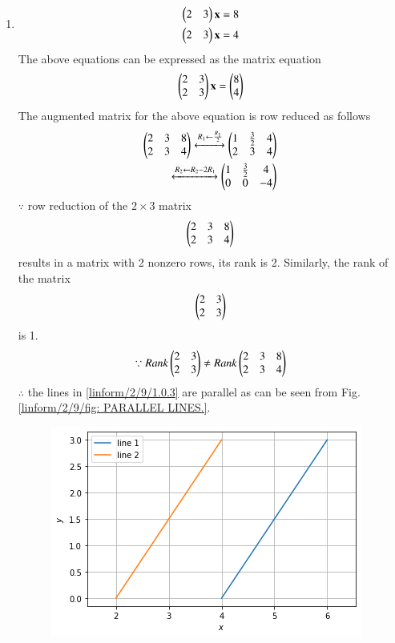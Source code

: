 \begin{enumerate}
\item
\begin{align}
\begin{split}
\begin{pmatrix}2 & 3 \end{pmatrix}\mathbf{x}&=8
\\
\begin{pmatrix}2 & 3 \end{pmatrix}\mathbf{x}&=4 \label{linform/2/9/1.0.3}
\end{split}
\end{align}
The above equations can be expressed as the matrix equation
\begin{align}
\begin{pmatrix}2 & 3\\2 & 3\end{pmatrix} \mathbf{x} = \begin{pmatrix}8\\4\end{pmatrix}
\end{align}
%
The augmented matrix for the above equation is row reduced as follows
\begin{align}
\begin{pmatrix}2 & 3 & 8\\2 & 3 & 4 \end{pmatrix} 
\xleftrightarrow {R_1\leftarrow \frac{R_1}{2}}\begin{pmatrix}1 & \frac{3}{2} & 4\\2 & 3 & 4 \end{pmatrix}
\\
\xleftrightarrow {R_2\leftarrow R_2-2R_1}\begin{pmatrix}1 & \frac{3}{2} & 4 \\0 & 0 & -4\end{pmatrix}
\\
\end{align}
%
$\because$ row reduction of the $2\times 3$ matrix
%
\begin{align}
\begin{pmatrix}2 & 3 & 8\\2 & 3 & 4\end{pmatrix}
\end{align}
%
results in a matrix with 2 nonzero rows, its rank is 2. 
%
Similarly, the rank of the matrix 
\begin{align}
\begin{pmatrix}2 & 3 \\2 & 3 \end{pmatrix} 
\end{align}
%
is 1.
%
\begin{align}
\because Rank \begin{pmatrix}2 & 3 \\2 & 3 \end{pmatrix} \ne Rank \begin{pmatrix}2 & 3 & 8\\2 & 3 & 4\end{pmatrix}
\end{align}
$\therefore$ the  lines in \eqref{linform/2/9/1.0.3} are parallel as can be seen from Fig.  \ref{linform/2/9/fig: PARALLEL LINES.}.
%
\begin{figure}[!ht]
    \centering
   \includegraphics[width=\columnwidth]{solutions/su2021/2/9/FIGURES/PARALLEL_LINES.png}

\end{figure}
\end{enumerate}
